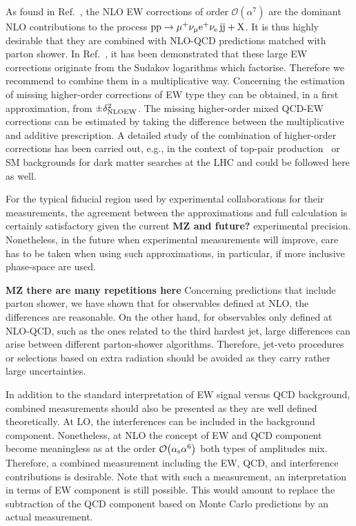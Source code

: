 As found in Ref.~\cite{Biedermann:2017bss}, the NLO EW corrections of order $\mathcal{O}{\left(\alpha^{7}\right)}$ are the dominant NLO contributions to the process $\text{p}\text{p}\to\mu^+\nu_\mu{\rm e}^+\nu_{\rm e}\,\text{j}\text{j}+\mathrm{X}$.
It is thus highly desirable that they are combined with NLO-QCD predictions matched with parton shower.
In Ref.~\cite{Biedermann:2016yds}, it has been demonstrated that these large EW corrections originate from the Sudakov logarithms which factorise.
Therefore we recommend to combine them in a multiplicative way.
Concerning the estimation of missing higher-order corrections of EW type they can be obtained, in a first approximation, from $\pm \delta^2_{\rm NLO EW}$.
The missing higher-order mixed QCD-EW corrections can be estimated by taking the difference between the multiplicative and additive prescription.
A detailed study of the combination of higher-order corrections has been carried out, e.g., in the context of top-pair production~\cite{Czakon:2017wor} or SM 
backgrounds for dark matter searches at the LHC \cite{Lindert:2017olm} and could be followed here as well.

For the typical fiducial region used by experimental collaborations for their measurements, the agreement between the approximations and full calculation is certainly satisfactory given the current {\bf MZ and future?} experimental precision.
Nonetheless, in the future when experimental measurements will improve, care has to be taken when using such approximations, in particular, if more inclusive phase-space are used.

{\bf MZ there are many repetitions here} 
Concerning predictions that include parton shower, we have shown that for observables defined at NLO, the differences are reasonable.
On the other hand, for observables only defined at NLO-QCD, such as the ones related to the third hardest jet, large differences can arise between different parton-shower algorithms.
Therefore, jet-veto procedures or selections based on extra radiation should be avoided as they carry rather large uncertainties.

In addition to the standard interpretation of EW signal versus QCD background, combined measurements should also be presented as they are well defined theoretically.
At LO, the interferences can be included in the background component.
Nonetheless, at NLO the concept of EW and QCD component become meaningless as at the order $\mathcal{O}{\left(\alpha_\text{s}\alpha^{6}\right)}$ both types of amplitudes mix.
Therefore, a combined measurement including the EW, QCD, and interference contributions is desirable.
Note that with such a measurement, an interpretation in terms of EW component is still possible.
This would amount to replace the subtraction of the QCD component based on Monte Carlo predictions by an actual measurement.

